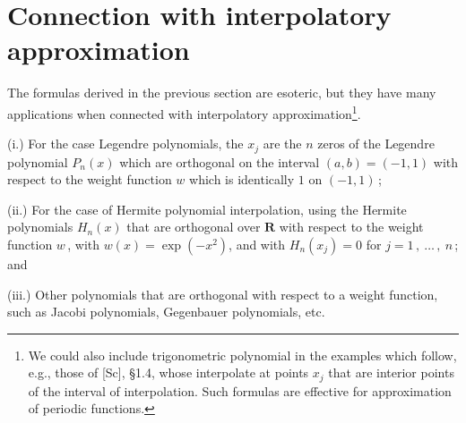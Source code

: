 \documentclass[11pt]{article}
\begin{document}
 \section{Connection with interpolatory approximation}%
 \setcounter{equation}{0}

 The formulas derived in the previous section are esoteric, but they
 have many applications when connected with interpolatory
 approximation\footnote{We could also include trigonometric
  polynomial in the examples which follow, e.g., those of [Sc], \S1.4,
  whose interpolate at points $x_j$ that are interior points of the
  interval of interpolation. Such formulas are effective for
  approximation of periodic functions.}.

 
\begin{description}
  \item{(i.)} For the case Legendre polynomials, the $x_j$ are the
  $n$ zeros of the Legendre polynomial $P_n(x)$ which are orthogonal
  on the interval $(a,b) = (-1,1)$ with respect to the weight function
  $w$ which is identically $1$ on $(-1,1)$\,;

  \item{(ii.)} For the case of Hermite polynomial interpolation, using
    the Hermite polynomials $H_n(x)$ that are orthogonal over
    ${\mathbf R}$ with respect to the weight function $w$\,, with
    $w(x) = \exp(-x^2)$, and with $H_n(x_j) = 0$ for $j =
    1\,,\ \ldots\,,\ n$\,; and

  \item{(iii.)} Other polynomials that are orthogonal with respect to a
    weight function, such as Jacobi polynomials, Gegenbauer
    polynomials, etc.
\end{description}
\end{document}
